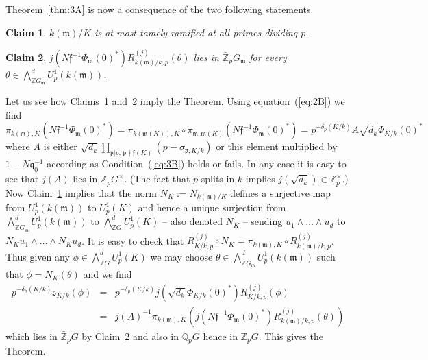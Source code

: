\documentclass[12pt]{article}
\newtheorem{claim}{Claim}[section]
\newcounter{rem}[section]%
\newcommand{\bbQ}{\ensuremath{\mathbb{Q}}}
\newcommand{\bbZ}{\ensuremath{\mathbb{Z}}}
\newcommand{\ff}{\ensuremath{\mathfrak{f}}}
\newcommand{\fm}{\ensuremath{\mathfrak{m}}}
\newcommand{\fp}{\ensuremath{\mathfrak{p}}}
\newcommand{\fq}{\ensuremath{\mathfrak{q}}}
\newcommand{\fs}{\ensuremath{\mathfrak{s}}}
\newcommand{\inv}{^{-1}}%
\newcommand{\ndiv}{\nmid}
\newcommand{\refeq}[1]{~(\ref{eq:#1})}
\newcommand{\rem}{\refstepcounter{rem}\noindent{\sc Remark \therem}}%
\renewcommand{\therem}{\thesection.\arabic{rem}}
\newcommand{\PhiKkoa}{\ensuremath{\Phi_{K/k}(0)^\ast}}
\newcommand{\sKk}{\ensuremath{\fs_{K/k}}}
\begin{document}
Theorem~\ref{thm:3A} is now a consequence of the two following statements.
\begin{claim}\label{claim:3A}
$k(\fm)/K$ is at most tamely ramified at all primes dividing $p$.
\end{claim}
\begin{claim}\label{claim:3B}
$j(N\ff\inv\Phi_\fm(0)^\ast)R^{(j)}_{k(\fm)/k,p}(\theta)$ lies in
$\bar{\bbZ}_p G_\fm$
for every $\theta\in\bigwedge_{\bbZ G_\fm}^dU^1_p(k(\fm))$.
\end{claim}
Let us see how Claims~\ref{claim:3A}
and~\ref{claim:3B} imply the Theorem. Using equation\refeq{2B} we find
\[
\pi_{k(\fm),K}(N\ff\inv \Phi_\fm(0)^\ast)=
\pi_{k(\fm(K)),K}\circ \pi_{\fm,\fm(K)}(N\ff\inv \Phi_\fm(0)^\ast)=
p^{-\delta_p(K/k)}A\sqrt{d_k}\PhiKkoa
\]
where $A$ is either $\sqrt{d_k}\prod_{\fp|p,\,\fp\ndiv\ff(K)}(p-\sigma_{\fp,K/k})$
or this element multiplied by $1-N\fq_0\inv$ according as
Condition\refeq{3B} holds or fails. In any case it is easy to see that
$j(A)$ lies in $\bbZ_p G^\times$. (The fact that
$p$ splits in $k$ implies $j(\sqrt{d_k})\in\bbZ_p^\times$.)
Now Claim~\ref{claim:3A} implies that the norm $N_K:=N_{k(\fm)/K}$ defines a
surjective map from $U^1_p(k(\fm))$ to $U^1_p(K)$ and hence a unique surjection
from $\bigwedge_{\bbZ G_\fm}^d U^1_p(k(\fm))$ to $\bigwedge_{\bbZ G}^d U^1_p(K)$
-- also denoted $N_K$ --
sending $u_1\wedge\ldots\wedge u_d$ to $N_Ku_1\wedge\ldots\wedge N_Ku_d$.
It is easy to check that
$R^{(j)}_{K/k,p}\circ N_K=\pi_{k(\fm),K}\circ R^{(j)}_{k(\fm)/k,p}$.
Thus given any $\phi\in\bigwedge_{\bbZ G}^d U^1_p(K)$ we may choose
$\theta\in\bigwedge_{\bbZ G_\fm}^d U^1_p(k(\fm))$ such that $\phi=N_K(\theta)$ and we find
\begin{eqnarray*}
p^{-\delta_p(K/k)}\sKk(\phi)&=&p^{-\delta_p(K/k)}j(\sqrt{d_k}\PhiKkoa)R^{(j)}_{K/k,p}(\phi)\\
&=&j(A)\inv\pi_{k(\fm),K}(j(N\ff\inv \Phi_\fm(0)^\ast)
R^{(j)}_{k(\fm)/k,p}(\theta))
\end{eqnarray*}
which lies in $\bar{\bbZ}_p G$ by Claim~\ref{claim:3B} and also in $\bbQ_p G$
hence in $\bbZ_p G$. This gives the Theorem.
\end{document}
